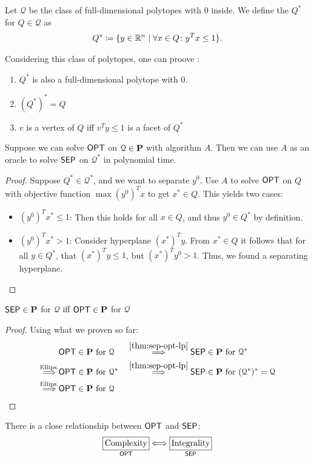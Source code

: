 \begin{definition}
    Let $\mathcal{Q}$ be the class of full-dimensional polytopes with $0$ inside.
    We define the  $Q^*$ for $Q \in \mathcal{Q}$ as
    \begin{align*}
        Q^* \coloneqq \{ y \in \mathbb{R}^n \mid \forall x \in Q \colon y^Tx \leq 1  \}.
    \end{align*}
\end{definition}
\begin{theorem}
    Considering this class of polytopes, one can proove \cite[Ch.~4,~Thm.~4.22]{comb-optimization-korte}:
    \begin{enumerate}
        \item $Q^*$ is also a full-dimensional polytope with $0$.
        \item $(Q^*)^* = Q$
        \item $v$ is a vertex of $Q$ iff $v^Ty \leq 1$ is a facet of $Q^*$
    \end{enumerate}
\end{theorem}
\begin{theorem}
    Suppose we can solve $\mathsf{OPT}$ on $\mathcal{Q} \in \pP$ with algorithm $A$.
    Then we can use $A$ as an oracle to solve $\mathsf{SEP}$ on $\mathcal{Q}^*$ in polynomial time.
    \label{thm:sep-opt-lp}
\end{theorem}
\begin{proof}
    Suppose $Q^* \in \mathcal{Q}^*$, and we want to separate $y^0$.
    Use $A$ to solve $\mathsf{OPT}$ on $Q$ with objective function $\max (y^0)^Tx$ to get $x^* \in Q$.
    This yields two cases:
    \begin{itemize}
        \item $(y^0)^Tx^* \leq 1$: Then this holds for all $x \in Q$, and thus $y^0 \in Q^*$ by definition.
        \item $(y^0)^Tx^* > 1$: Consider hyperplane $(x^*)^Ty$. From $x^* \in Q$ it follows that
              for all $y \in Q^*$, that $(x^*)^Ty \leq 1$, but $(x^*)^Ty^0 > 1$. Thus, we found a separating hyperplane.
    \end{itemize}
\end{proof}
\begin{theorem}
    $\mathsf{SEP} \in \mathbf{P}$ for $\mathcal{Q}$ iff $\mathsf{OPT} \in \mathbf{P}$ for $\mathcal{Q}$
\end{theorem}
\begin{proof} Using what we proven so far:
    \begin{alignat*}{2}
                                       & \OPT \in \pP \text{ for } \mathcal{Q}   &  & \overset{\ref{thm:sep-opt-lp}}{\IMP}  \SEP \in \pP \text{ for } \mathcal{Q}^*                 \\
        \overset{\text{Ellips.}}{\IMP} & \OPT \in \pP \text{ for } \mathcal{Q}^* &  & \overset{\ref{thm:sep-opt-lp}}{\IMP}  \SEP \in \pP \text{ for } (\mathcal{Q}^*)^*=\mathcal{Q} \\
        \overset{\text{Ellips.}}{\IMP} & \OPT \in \pP \text{ for } \mathcal{Q}
    \end{alignat*}
\end{proof}
\begin{conclusion}
    There is a close relationship between $\mathsf{OPT}$ and $\mathsf{SEP}$:
    \[
        \underset{\OPT}{\framebox[1.1\width]{\text{Complexity}}} \Longleftrightarrow \underset{\SEP}{\framebox[1.1\width]{\text{Integrality}}}
    \]
\end{conclusion}